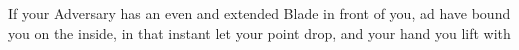 

If your Adversary has an even and extended Blade in front of you, ad have bound you on the inside, in that instant let your point drop, and your hand you lift with
